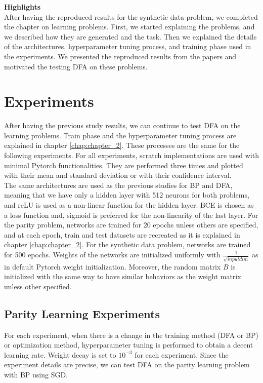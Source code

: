 \documentclass[a4paper, nobind]{templates/ociamthesis}
\begin{document}
\noindent \textbf{Highlights}\\
After having the reproduced results for the synthetic data problem, we completed the chapter on learning problems. First, we started explaining the problems, and we described how they are generated and the task. Then we explained the details of the architectures, hyperparameter tuning process, and training phase used in the experiments. We presented the reproduced results from the papers and motivated the testing DFA on these problems.

\hypertarget{chap:chapter_3}{%
\chapter{Experiments}\label{chap:chapter_3}}

\noindent After having the previous study results, we can continue to test DFA on the learning problems. Train phase and the hyperparameter tuning process are explained in chapter \ref{chap:chapter_2}. These processes are the same for the following experiments. For all experiments, scratch implementations are used with minimal Pytorch functionalities. They are performed three times and plotted with their mean and standard deviation or with their confidence interval.\\
The same architectures are used as the previous studies for BP and DFA, meaning that we have only a hidden layer with 512 neurons for both problems, and reLU is used as a non-linear function for the hidden layer. BCE is chosen as a loss function and, sigmoid is preferred for the non-linearity of the last layer. For the parity problem, networks are trained for 20 epochs unless others are specified, and at each epoch, train and test datasets are recreated as it is explained in chapter \ref{chap:chapter_2}. For the synthetic data problem, networks are trained for 500 epochs. Weights of the networks are initialized uniformly with \(\frac{1}{\sqrt{input dim}}\) as in default Pytorch weight initialization. Moreover, the random matrix \(B\) is initialized with the same way to have similar behaviors as the weight matrix unless other specified.

\hypertarget{parity-learning-experiments}{%
\section{Parity Learning Experiments}\label{parity-learning-experiments}}

For each experiment, when there is a change in the training method (DFA or BP) or optimization method, hyperparameter tuning is performed to obtain a decent learning rate. Weight decay is set to \(10^{-3}\) for each experiment. Since the experiment details are precise, we can test DFA on the parity learning problem with BP using SGD.
\end{document}
